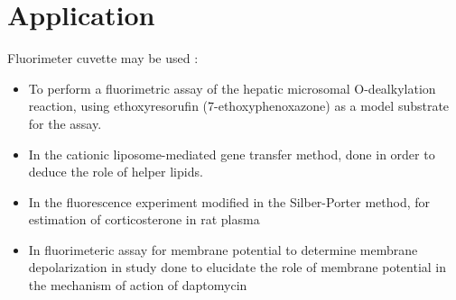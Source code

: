 \documentclass[11pt]{article}
\begin{document}
\section*{Application}
Fluorimeter cuvette may be used :
\begin{itemize}
\item To perform a fluorimetric assay of the hepatic microsomal O-dealkylation reaction, using ethoxyresorufin (7-ethoxyphenoxazone) as a model substrate for the assay.
\item In the cationic liposome-mediated gene transfer method, done in order to deduce the role of helper lipids.
\item In the fluorescence experiment modified in the Silber-Porter method, for estimation of corticosterone in rat plasma
\item In fluorimeteric assay for membrane potential to determine membrane depolarization in study done to elucidate the role of membrane potential in the mechanism of action of daptomycin
\end{itemize}
\end{document}

